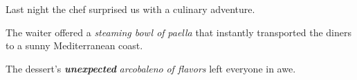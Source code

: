 \documentclass[11pt,a4paper]{article}
\begin{document}
Last night the chef surprised us with a culinary adventure.

The waiter offered a \textit{steaming bowl of} \textit{paella} that instantly transported the diners to a sunny Mediterranean coast.

The dessert’s \textit{\textbf{unexpected}} \textit{arcobaleno} \textit{of flavors} left everyone in awe.
\end{document}
